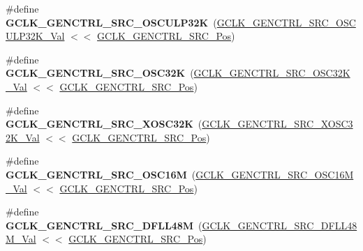 \begin{DoxyCompactItemize}
\item 
\hypertarget{group___s_a_m_l21___g_c_l_k_gaeefd6f0d9789f9f1c1ee07d1a256f93c}{}\#define {\bfseries G\+C\+L\+K\+\_\+\+G\+E\+N\+C\+T\+R\+L\+\_\+\+S\+R\+C\+\_\+\+O\+S\+C\+U\+L\+P32\+K}~(\hyperlink{group___s_a_m_l21___g_c_l_k_ga42e2c1ea6d7f04f75657e31791336ec6}{G\+C\+L\+K\+\_\+\+G\+E\+N\+C\+T\+R\+L\+\_\+\+S\+R\+C\+\_\+\+O\+S\+C\+U\+L\+P32\+K\+\_\+\+Val} $<$$<$ \hyperlink{group___s_a_m_l21___g_c_l_k_ga3ca6fb0d36a0f1194282d2517b22965f}{G\+C\+L\+K\+\_\+\+G\+E\+N\+C\+T\+R\+L\+\_\+\+S\+R\+C\+\_\+\+Pos})\label{group___s_a_m_l21___g_c_l_k_gaeefd6f0d9789f9f1c1ee07d1a256f93c}

\item 
\hypertarget{group___s_a_m_l21___g_c_l_k_gabdada430076745a99ece643763c5b14b}{}\#define {\bfseries G\+C\+L\+K\+\_\+\+G\+E\+N\+C\+T\+R\+L\+\_\+\+S\+R\+C\+\_\+\+O\+S\+C32\+K}~(\hyperlink{group___s_a_m_l21___g_c_l_k_ga79a91b96132812e2d8fec7fb79dc6cde}{G\+C\+L\+K\+\_\+\+G\+E\+N\+C\+T\+R\+L\+\_\+\+S\+R\+C\+\_\+\+O\+S\+C32\+K\+\_\+\+Val}   $<$$<$ \hyperlink{group___s_a_m_l21___g_c_l_k_ga3ca6fb0d36a0f1194282d2517b22965f}{G\+C\+L\+K\+\_\+\+G\+E\+N\+C\+T\+R\+L\+\_\+\+S\+R\+C\+\_\+\+Pos})\label{group___s_a_m_l21___g_c_l_k_gabdada430076745a99ece643763c5b14b}

\item 
\hypertarget{group___s_a_m_l21___g_c_l_k_gaf2db90c4ecefc9b935dd47d82968eb27}{}\#define {\bfseries G\+C\+L\+K\+\_\+\+G\+E\+N\+C\+T\+R\+L\+\_\+\+S\+R\+C\+\_\+\+X\+O\+S\+C32\+K}~(\hyperlink{group___s_a_m_l21___g_c_l_k_ga087326ba1d0ac766f2835e5460c72ef0}{G\+C\+L\+K\+\_\+\+G\+E\+N\+C\+T\+R\+L\+\_\+\+S\+R\+C\+\_\+\+X\+O\+S\+C32\+K\+\_\+\+Val}  $<$$<$ \hyperlink{group___s_a_m_l21___g_c_l_k_ga3ca6fb0d36a0f1194282d2517b22965f}{G\+C\+L\+K\+\_\+\+G\+E\+N\+C\+T\+R\+L\+\_\+\+S\+R\+C\+\_\+\+Pos})\label{group___s_a_m_l21___g_c_l_k_gaf2db90c4ecefc9b935dd47d82968eb27}

\item 
\hypertarget{group___s_a_m_l21___g_c_l_k_ga47c76788e69732cd4716bcd122c116e5}{}\#define {\bfseries G\+C\+L\+K\+\_\+\+G\+E\+N\+C\+T\+R\+L\+\_\+\+S\+R\+C\+\_\+\+O\+S\+C16\+M}~(\hyperlink{group___s_a_m_l21___g_c_l_k_ga12a4820422471b9d5b5c82fd5f0c0ebc}{G\+C\+L\+K\+\_\+\+G\+E\+N\+C\+T\+R\+L\+\_\+\+S\+R\+C\+\_\+\+O\+S\+C16\+M\+\_\+\+Val}   $<$$<$ \hyperlink{group___s_a_m_l21___g_c_l_k_ga3ca6fb0d36a0f1194282d2517b22965f}{G\+C\+L\+K\+\_\+\+G\+E\+N\+C\+T\+R\+L\+\_\+\+S\+R\+C\+\_\+\+Pos})\label{group___s_a_m_l21___g_c_l_k_ga47c76788e69732cd4716bcd122c116e5}

\item 
\hypertarget{group___s_a_m_l21___g_c_l_k_gaa23918b1d8f76e45db3cbec26eb70973}{}\#define {\bfseries G\+C\+L\+K\+\_\+\+G\+E\+N\+C\+T\+R\+L\+\_\+\+S\+R\+C\+\_\+\+D\+F\+L\+L48\+M}~(\hyperlink{group___s_a_m_l21___g_c_l_k_ga70357963bac751c47a0b097568f1ec34}{G\+C\+L\+K\+\_\+\+G\+E\+N\+C\+T\+R\+L\+\_\+\+S\+R\+C\+\_\+\+D\+F\+L\+L48\+M\+\_\+\+Val}  $<$$<$ \hyperlink{group___s_a_m_l21___g_c_l_k_ga3ca6fb0d36a0f1194282d2517b22965f}{G\+C\+L\+K\+\_\+\+G\+E\+N\+C\+T\+R\+L\+\_\+\+S\+R\+C\+\_\+\+Pos})\label{group___s_a_m_l21___g_c_l_k_gaa23918b1d8f76e45db3cbec26eb70973}


\end{DoxyCompactItemize}
